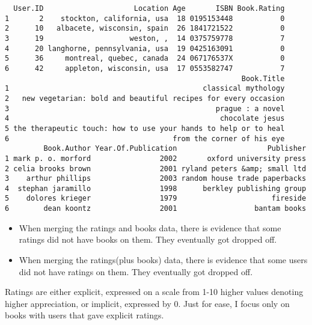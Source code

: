 \documentclass[
]{report}
\providecommand{\tightlist}{%
  \setlength{\itemsep}{0pt}\setlength{\parskip}{0pt}}\usepackage{longtable,booktabs,array}
\begin{document}
\begin{verbatim}
  User.ID                     Location Age       ISBN Book.Rating
1       2    stockton, california, usa  18 0195153448           0
2      10   albacete, wisconsin, spain  26 1841721522           0
3      19                    weston, ,  14 0375759778           7
4      20 langhorne, pennsylvania, usa  19 0425163091           0
5      36     montreal, quebec, canada  24 067176537X           0
6      42     appleton, wisconsin, usa  17 0553582747           7
                                                       Book.Title
1                                             classical mythology
2   new vegetarian: bold and beautiful recipes for every occasion
3                                                prague : a novel
4                                                 chocolate jesus
5 the therapeutic touch: how to use your hands to help or to heal
6                                      from the corner of his eye
         Book.Author Year.Of.Publication                     Publisher
1 mark p. o. morford                2002       oxford university press
2 celia brooks brown                2001 ryland peters &amp; small ltd
3    arthur phillips                2003 random house trade paperbacks
4  stephan jaramillo                1998      berkley publishing group
5    dolores krieger                1979                      fireside
6        dean koontz                2001                  bantam books
\end{verbatim}

\begin{itemize}
\tightlist
\item
  When merging the ratings and books data, there is evidence that some
  ratings did not have books on them. They eventually got dropped off.
\item
  When merging the ratings(plus books) data, there is evidence that some
  users did not have ratings on them. They eventually got dropped off.
\end{itemize}

Ratings are either explicit, expressed on a scale from 1-10 higher
values denoting higher appreciation, or implicit, expressed by 0. Just
for ease, I focus only on books with users that gave explicit ratings.
\end{document}
